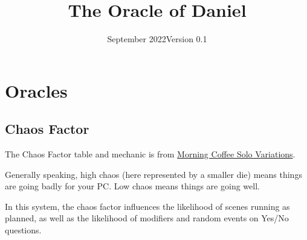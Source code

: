 \usepackage[english]{babel}
\usepackage[utf8]{inputenc}
\usepackage[singlelinecheck=false]{caption}
\usepackage{listings}
\usepackage{shortvrb}
\usepackage{stfloats}
\usepackage{hyperref}


\MakeShortVerb{|}


\title{The Oracle of Daniel}
\date{September 2022\newline{}Version 0.1}



\mainmatter
\section{Oracles}
\subsection{Chaos Factor}
The Chaos Factor table and mechanic is from
\href{https://aleaiactandaest.blogspot.com/p/downloads.html}{Morning Coffee Solo
Variations}.

Generally speaking, high chaos (here represented by a smaller die) means things
are going badly for your PC. Low chaos means things are going well.

In this system, the chaos factor influences the likelihood of scenes running as
planned, as well as the likelihood of modifiers and random events on Yes/No
questions.


